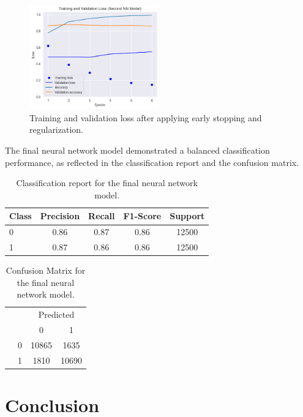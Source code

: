 \documentclass[conference]{IEEEtran}
\begin{document}
	\begin{figure}[htbp]
		\centering
		\includegraphics[width=0.5\textwidth]{nn_loss_plot2.png}
		\caption{Training and validation loss after applying early stopping and regularization.}
		\label{fig:nn_loss_plot2}
	\end{figure}
	
	The final neural network model demonstrated a balanced classification performance, as reflected in the classification report and the confusion matrix.
	
	\begin{table}[htbp]
		\centering
		\begin{tabular}{lcccc}
			\hline
			Class & Precision & Recall & F1-Score & Support \\ \hline
			0     & 0.86      & 0.87   & 0.86     & 12500   \\
			1     & 0.87      & 0.86   & 0.86     & 12500   \\ \hline
		\end{tabular}
		\caption{Classification report for the final neural network model.}
		\label{tab:classification_report}
	\end{table}
	
	\begin{table}[htbp]
		\centering
		\caption{Confusion Matrix for the final neural network model.}
		\label{tab:confusion_matrix}
		\begin{tabular}{cc|cc}
			\multicolumn{2}{c}{} & \multicolumn{2}{c}{Predicted} \\
			& & 0 & 1 \\ 
			\cline{2-4}
			\multirow{2}{*}{\rotatebox[origin=c]{90}{Actual}}
			& 0 & 10865 & 1635 \\
			& 1 & 1810 & 10690 \\
		\end{tabular}
	\end{table}
	
	\section{Conclusion}
	
\end{document}

